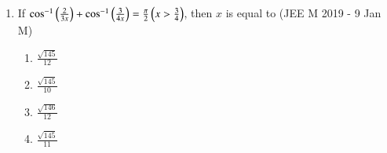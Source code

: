\documentclass[journal]{IEEEtran}
\begin{document}
\begin{enumerate}
{\begin{multicols}{4}
		\end{multicols}
	}
	\item{
			If $\cos^{-1}\left(\frac{2}{3x}\right) + \cos^{-1}\left(\frac{3}{4x}\right) = \frac{\pi}{2} \left(x > \frac{3}{4}\right)$, then $x$ is equal to \hfill (JEE M 2019 - 9 Jan M)
		\begin{multicols}{4}
		\begin{enumerate}
			\item{$\frac{\sqrt{145}}{12}$}
			\columnbreak
			\item{$\frac{\sqrt{145}}{10}$}
			\columnbreak
			\item{$\frac{\sqrt{146}}{12}$}
			\columnbreak
			\item{$\frac{\sqrt{145}}{11}$}
		\end{enumerate}
		\end{multicols}
	}
\end{enumerate}
\end{document}
